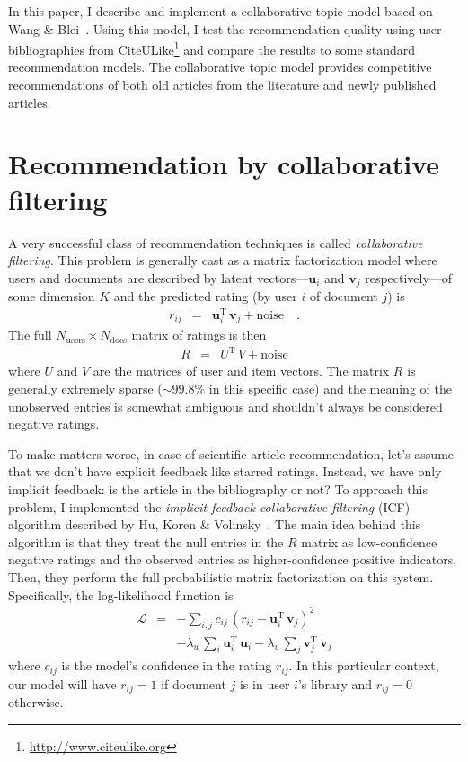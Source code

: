 \documentclass[11pt]{article}
\begin{document}
In this paper, I describe and implement a collaborative topic model based on
Wang \& Blei~.
Using this model, I test the recommendation quality using user bibliographies
from CiteULike\footnote{\url{http://www.citeulike.org}} and compare the
results to some standard recommendation models.
The collaborative topic model provides competitive recommendations of both old
articles from the literature and newly published articles.

\section{Recommendation by collaborative filtering}

A very successful class of recommendation techniques is called
\emph{collaborative filtering}.
This problem is generally cast as a matrix factorization model where users and
documents are described by latent vectors---$\mathbf{u}_i$ and $\mathbf{v}_j$
respectively---of some dimension $K$ and the predicted rating (by user $i$ of
document $j$) is
\begin{eqnarray}
r_{ij} &=& \mathbf{u}_i^\mathrm{T} \, \mathbf{v}_j + \mathrm{noise} \quad.
\end{eqnarray}
The full $N_\mathrm{users}\times N_\mathrm{docs}$ matrix of ratings is then
\begin{eqnarray}
R &=& U^\mathrm{T}\,V + \mathrm{noise}
\end{eqnarray}
where $U$ and $V$ are the matrices of user and item vectors.
The matrix $R$ is generally extremely sparse ($\sim 99.8\%$ in this specific
case) and the meaning of the unobserved entries is somewhat ambiguous and
shouldn't always be considered negative ratings.

To make matters worse, in case of scientific article recommendation, let's
assume that we don't have explicit feedback like starred ratings.
Instead, we have only implicit feedback: is the article in the bibliography or
not?
To approach this problem, I implemented the \emph{implicit feedback
collaborative filtering} (ICF) algorithm described by Hu, Koren
\& Volinsky~.
The main idea behind this algorithm is that they treat the null entries in the
$R$ matrix as low-confidence negative ratings and the observed entries
as higher-confidence positive indicators.
Then, they perform the full probabilistic matrix factorization on this system.
Specifically, the log-likelihood function is
\begin{eqnarray}\label{eq:lnlike}
\mathcal{L} &=& -\sum_{i,j}
                c_{ij}\,(r_{ij}-\mathbf{u}_i^\mathrm{T}\,\mathbf{v}_j)^2
\nonumber\\
&& - \lambda_u\,\sum_i \mathbf{u}_i^\mathrm{T}\,\mathbf{u}_i
 - \lambda_v\,\sum_j \mathbf{v}_j^\mathrm{T}\,\mathbf{v}_j
\end{eqnarray}
where $c_{ij}$ is the model's confidence in the rating $r_{ij}$.
In this particular context, our model will have $r_{ij} = 1$ if document $j$
is in user $i$'s library and $r_{ij} = 0$ otherwise.
\end{document}
